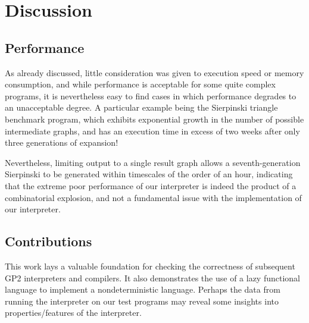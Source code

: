 
\section{Discussion}

\subsection{Performance}

As already discussed, little consideration was given to execution speed or memory consumption, and while performance is acceptable for some quite complex programs, it is nevertheless easy to find cases in which performance degrades to an unacceptable degree. A particular example being the Sierpinski triangle benchmark program, which exhibits exponential growth in the number of possible intermediate graphs, and has an execution time in excess of two weeks after only three generations of expansion!


Nevertheless, limiting output to a single result graph allows a seventh-generation Sierpinski to be generated within timescales of the order of an hour, indicating that the extreme poor performance of our interpreter is indeed the product of a combinatorial explosion, and not a fundamental issue with the implementation of our interpreter.


\subsection{Contributions}

This work lays a valuable foundation for checking the correctness of subsequent GP2 interpreters and compilers. It also demonstrates the use of a lazy functional language to implement a nondeterministic language. Perhaps the data from running the interpreter on our test programs may reveal some insights into properties/features of the interpreter.




